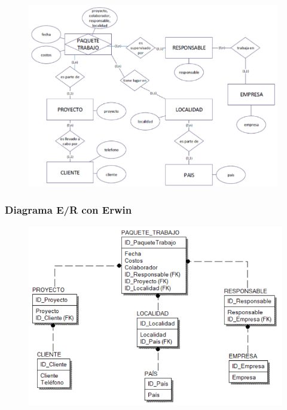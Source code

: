 \documentclass[12pt,letterpaper]{article}
\begin{document}
	\begin{figure}[htb]
		\begin{center}
			\includegraphics[width=11cm]{./IMAGENES/Ejercicio_3}
			
		\end{center}
	\end{figure}

\subsubsection{\textbf{Diagrama E/R con Erwin }}

	\begin{figure}[htb]
		\begin{center}
			\includegraphics[width=12cm]{./Imagenes/erwin_3}
			
		\end{center}
	\end{figure}

\newpage
\end{document}
